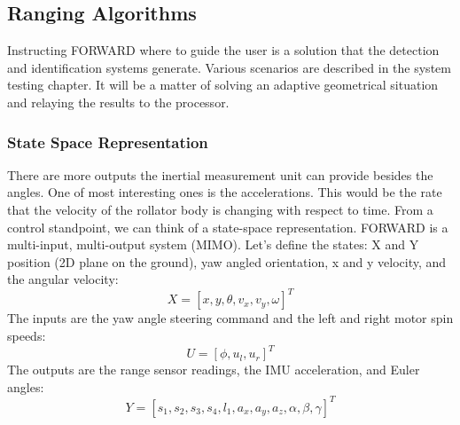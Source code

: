 \subsection{Ranging Algorithms}
\noindent Instructing FORWARD where to guide the user is a solution that the detection and identification systems generate. Various scenarios are described in the system testing chapter. It will be a matter of solving an adaptive geometrical situation and relaying the results to the processor.\\

\subsubsection{State Space Representation}
\noindent There are more outputs the inertial measurement unit can provide besides the angles. One of most interesting ones is the accelerations. This would be the rate that the velocity of the rollator body is changing with respect to time. From a control standpoint, we can think of a state-space representation. FORWARD is a multi-input, multi-output system (MIMO). Let's define the states:
X and Y position (2D plane on the ground), yaw angled orientation, x and y velocity, and the angular velocity:
$$X = [x, y, \theta, v_x, v_y, \omega]^T$$
The inputs are the yaw angle steering command and the left and right motor spin speeds:
$$U = [\phi, u_l, u_r]^T$$
The outputs are the range sensor readings, the IMU acceleration, and Euler angles:
$$Y = [s_1, s_2, s_3, s_4, l_1, a_x, a_y, a_z, \alpha, \beta, \gamma ]^T$$

